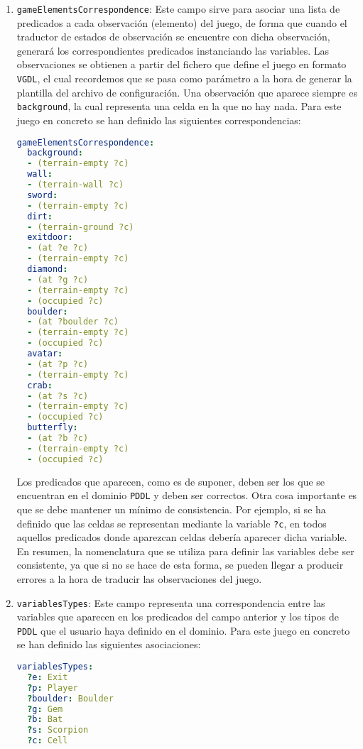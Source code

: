 \begin{enumerate}
    \item \texttt{gameElementsCorrespondence}: Este campo sirve para asociar una lista de predicados
    a cada observación (elemento) del juego, de forma que cuando el traductor de estados de observación
    se encuentre con dicha observación, generará los correspondientes predicados instanciando las variables.
    Las observaciones se obtienen a partir del fichero que define el juego en formato \texttt{VGDL}, el
    cual recordemos que se pasa como parámetro a la hora de generar la plantilla del archivo de configuración.
    Una observación que aparece siempre es \texttt{background}, la cual representa una celda en la que no
    hay nada. Para este juego en concreto se han definido las siguientes correspondencias:
    
    \begin{lstlisting}[language=yaml]
gameElementsCorrespondence:
  background:
  - (terrain-empty ?c)
  wall:
  - (terrain-wall ?c)
  sword:
  - (terrain-empty ?c)
  dirt:
  - (terrain-ground ?c)
  exitdoor:
  - (at ?e ?c)
  - (terrain-empty ?c)
  diamond:
  - (at ?g ?c)
  - (terrain-empty ?c)
  - (occupied ?c)
  boulder:
  - (at ?boulder ?c)
  - (terrain-empty ?c)
  - (occupied ?c)
  avatar:
  - (at ?p ?c)
  - (terrain-empty ?c)
  crab:
  - (at ?s ?c)
  - (terrain-empty ?c)
  - (occupied ?c)
  butterfly:
  - (at ?b ?c)
  - (terrain-empty ?c)
  - (occupied ?c)    
    \end{lstlisting}
    
    Los predicados que aparecen, como es de suponer, deben ser los que se encuentran en el dominio
    \texttt{PDDL} y deben ser correctos. Otra cosa importante es que se debe mantener un mínimo de consistencia.
    Por ejemplo, si se ha definido que las celdas se representan mediante la variable \texttt{?c}, en
    todos aquellos predicados donde aparezcan celdas debería aparecer dicha variable. En resumen, la nomenclatura
    que se utiliza para definir las variables debe ser consistente, ya que si no se hace de esta forma,
    se pueden llegar a producir errores a la hora de traducir las observaciones del juego.
    
    \item \texttt{variablesTypes}: Este campo representa una correspondencia entre las variables que
    aparecen en los predicados del campo anterior y los tipos de \texttt{PDDL} que el usuario haya definido
    en el dominio. Para este juego en concreto se han definido las siguientes asociaciones:
    
    \begin{lstlisting}[language=yaml]
variablesTypes:
  ?e: Exit
  ?p: Player
  ?boulder: Boulder
  ?g: Gem
  ?b: Bat
  ?s: Scorpion
  ?c: Cell
    \end{lstlisting}
    

\end{enumerate}
